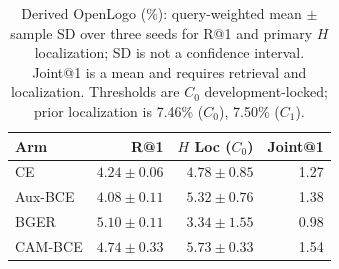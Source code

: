 \begin{table}[t]
\centering\small\setlength{\tabcolsep}{4pt}
\caption{Derived OpenLogo (\%): query-weighted mean $\pm$ sample SD over
three seeds for R@1 and primary $H$ localization; SD is not a confidence
interval. Joint@1 is a mean and requires retrieval and localization.
Thresholds are $C_0$ development-locked; prior localization is
7.46\% ($C_0$), 7.50\% ($C_1$).}
\label{tab:openlogo}
\begin{tabular}{@{}lrrr@{}}
\toprule Arm & R@1 & $H$ Loc ($C_0$) & Joint@1\\
\midrule
CE & $4.24\pm0.06$ & $4.78\pm0.85$ & 1.27 \\
Aux-BCE & $4.08\pm0.11$ & $5.32\pm0.76$ & 1.38 \\
BGER & $5.10\pm0.11$ & $3.34\pm1.55$ & 0.98 \\
CAM-BCE & $4.74\pm0.33$ & $5.73\pm0.33$ & 1.54 \\
\bottomrule\end{tabular}\end{table}
